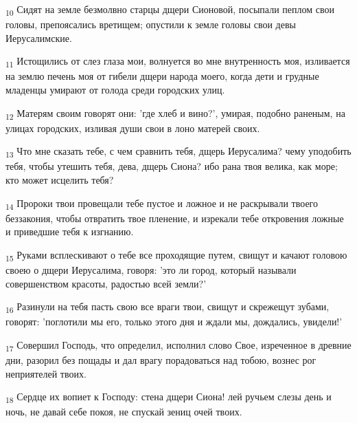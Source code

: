 \begin{tcolorbox}
\textsubscript{10} Сидят на земле безмолвно старцы дщери Сионовой, посыпали пеплом свои головы, препоясались вретищем; опустили к земле головы свои девы Иерусалимские.
\end{tcolorbox}
\begin{tcolorbox}
\textsubscript{11} Истощились от слез глаза мои, волнуется во мне внутренность моя, изливается на землю печень моя от гибели дщери народа моего, когда дети и грудные младенцы умирают от голода среди городских улиц.
\end{tcolorbox}
\begin{tcolorbox}
\textsubscript{12} Матерям своим говорят они: 'где хлеб и вино?', умирая, подобно раненым, на улицах городских, изливая души свои в лоно матерей своих.
\end{tcolorbox}
\begin{tcolorbox}
\textsubscript{13} Что мне сказать тебе, с чем сравнить тебя, дщерь Иерусалима? чему уподобить тебя, чтобы утешить тебя, дева, дщерь Сиона? ибо рана твоя велика, как море; кто может исцелить тебя?
\end{tcolorbox}
\begin{tcolorbox}
\textsubscript{14} Пророки твои провещали тебе пустое и ложное и не раскрывали твоего беззакония, чтобы отвратить твое пленение, и изрекали тебе откровения ложные и приведшие тебя к изгнанию.
\end{tcolorbox}
\begin{tcolorbox}
\textsubscript{15} Руками всплескивают о тебе все проходящие путем, свищут и качают головою своею о дщери Иерусалима, говоря: 'это ли город, который называли совершенством красоты, радостью всей земли?'
\end{tcolorbox}
\begin{tcolorbox}
\textsubscript{16} Разинули на тебя пасть свою все враги твои, свищут и скрежещут зубами, говорят: 'поглотили мы его, только этого дня и ждали мы, дождались, увидели!'
\end{tcolorbox}
\begin{tcolorbox}
\textsubscript{17} Совершил Господь, что определил, исполнил слово Свое, изреченное в древние дни, разорил без пощады и дал врагу порадоваться над тобою, вознес рог неприятелей твоих.
\end{tcolorbox}
\begin{tcolorbox}
\textsubscript{18} Сердце их вопиет к Господу: стена дщери Сиона! лей ручьем слезы день и ночь, не давай себе покоя, не спускай зениц очей твоих.
\end{tcolorbox}
